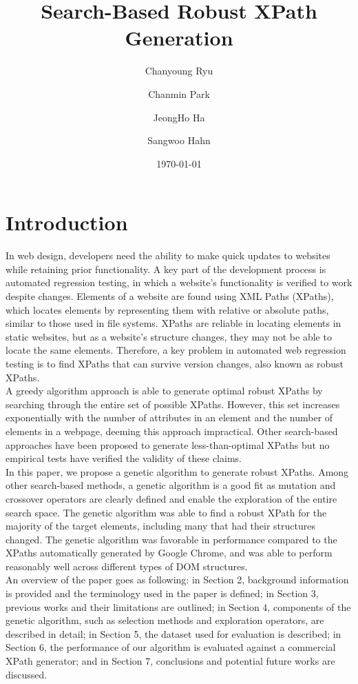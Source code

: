 \documentclass[format=acmlarge, nonacm=true]{acmart}
\title{Search-Based Robust XPath Generation}
\author{Chanyoung Ryu}
\affiliation{KAIST Department of Computer Science}
\author{Chanmin Park}
\affiliation{KAIST Department of Computer Science}
\author{JeongHo Ha}
\affiliation{KAIST Department of Computer Science}
\author{Sangwoo Hahn}
\affiliation{KAIST Department of Computer Science}
\date{\today}
\begin{document}
\maketitle
\section{Introduction}
In web design, developers need the ability to make quick updates to websites while retaining prior functionality. A key part of the development process is automated regression testing, in which a website’s functionality is verified to work despite changes. Elements of a website are found using XML Paths (XPaths), which locates elements by representing them with relative or absolute paths, similar to those used in file systems. XPaths are reliable in locating elements in static websites, but as a website's structure changes, they may not be able to locate the same elements. Therefore, a key problem in automated web regression testing is to find XPaths that can survive version changes, also known as robust XPaths.\\
A greedy algorithm approach is able to generate optimal robust XPaths by searching through the entire set of possible XPaths. However, this set increases exponentially with the number of attributes in an element and the number of elements in a webpage, deeming this approach impractical. Other search-based approaches have been proposed to generate less-than-optimal XPaths but no empirical tests have verified the validity of these claims.\\
In this paper, we propose a genetic algorithm to generate robust XPaths. Among other search-based methods, a genetic algorithm is a good fit as mutation and crossover operators are clearly defined and enable the exploration of the entire search space. The genetic algorithm was able to find a robust XPath for the majority of the target elements, including many that had their structures changed. The genetic algorithm was favorable in performance compared to the XPaths automatically generated by Google Chrome, and was able to perform reasonably well across different types of DOM structures. \\
An overview of the paper goes as following: in Section 2, background information is provided and the terminology used in the paper is defined; in Section 3, previous works and their limitations are outlined; in Section 4, components of the genetic algorithm, such as selection methods and exploration operators, are described in detail; in Section 5, the dataset used for evaluation is described; in Section 6, the performance of our algorithm is evaluated against a commercial XPath generator; and in Section 7, conclusions and potential future works are discussed.\\
\end{document}
